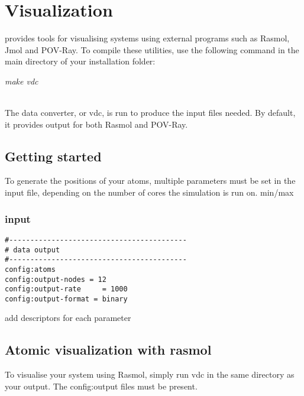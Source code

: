 \chapter{Visualization}\label{chap:visualization}

\vampire provides tools for visualising systems using external programs such as Rasmol, Jmol and POV-Ray. To compile these utilities, use the following command in the main directory of your \vampire installation folder:

\begin{minipage}[c]{\textwidth}
\centering
\textit{make vdc}
\end{minipage}\\
 
 The \vampire data converter, or vdc, is run to produce the input files needed. By default, it provides output for both Rasmol and POV-Ray. 


\section*{Getting started}
To generate the positions of your atoms, multiple parameters must be set in the input file, depending on the number of cores the simulation is run on.  
min/max\\

\subsection*{input}
{\footnotesize
\begin{verbatim}
#------------------------------------------
# data output
#------------------------------------------
config:atoms
config:output-nodes = 12
config:output-rate     = 1000
config:output-format = binary
\end{verbatim}
}

add descriptors for each parameter\\

\section*{Atomic visualization with rasmol}

To visualise your system using Rasmol, simply run vdc in the same directory as your output. The config:output files must be present.\\

